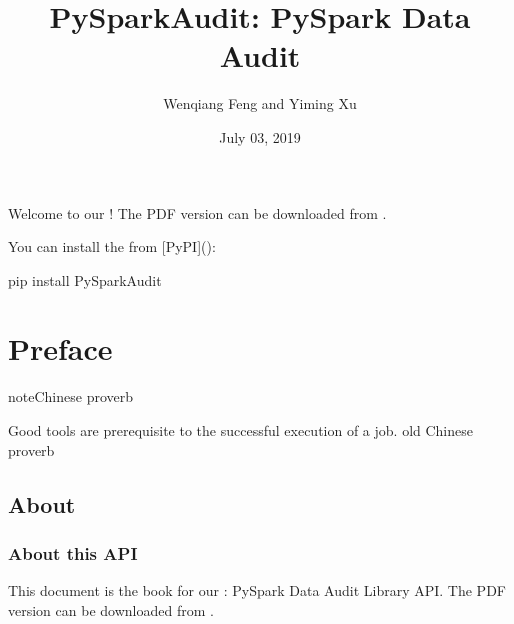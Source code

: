 \documentclass[letterpaper,12pt,english]{sphinxmanual}
\title{PySparkAudit: PySpark Data Audit}
\date{July 03, 2019}
\author{Wenqiang Feng and Yiming Xu}
\begin{document}
\pagestyle{empty}
\maketitle
\pagestyle{plain}
\sphinxtableofcontents
\pagestyle{normal}
\label{\detokenize{index::doc}}\label{\detokenize{index:index}}\begin{quote}

\begin{figure}[htbp]
\centering

\noindent{}
\end{figure}
\end{quote}

Welcome to our ! The PDF version can be downloaded from .

You can install the  from {[}PyPI{]}():

%
\begin{sphinxVerbatim}[commandchars=\\\{\}]
pip install PySparkAudit
\end{sphinxVerbatim}




\chapter{Preface}
\label{\detokenize{preface:preface}}\label{\detokenize{preface:id1}}\label{\detokenize{preface::doc}}
\begin{sphinxadmonition}{note}{Chinese proverb}

Good tools are prerequisite to the successful execution of a job. \textendash{} old Chinese proverb
\end{sphinxadmonition}


\section{About}
\label{\detokenize{preface:about}}

\subsection{About this API}
\label{\detokenize{preface:about-this-api}}
This document is the  book for our : PySpark Data Audit Library  API. The PDF version can be downloaded from . 
\end{document}
